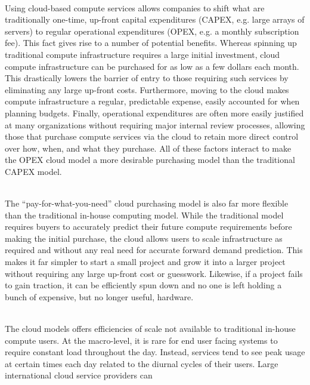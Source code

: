 \begin{packed_desc}
\item[OPEX vs CAPEX] \hfill \\ Using cloud-based compute services
  allows companies to shift what are traditionally one-time, up-front
  capital expenditures (CAPEX, e.g. large arrays of servers) to
  regular operational expenditures (OPEX, e.g. a monthly subscription
  fee). This fact gives rise to a number of potential
  benefits. Whereas spinning up traditional compute infrastructure
  requires a large initial investment, cloud compute infrastructure
  can be purchased for as low as a few dollars each month. This
  drastically lowers the barrier of entry to those requiring such
  services by eliminating any large up-front costs. Furthermore,
  moving to the cloud makes compute infrastructure a regular,
  predictable expense, easily accounted for when planning
  budgets. Finally, operational expenditures are often more easily
  justified at many organizations without requiring major internal
  review processes, allowing those that purchase compute services via
  the cloud to retain more direct control over how, when, and what
  they purchase. All of these factors interact to make the OPEX cloud
  model a more desirable purchasing model than the traditional CAPEX
  model.
\item[Flexibility] \hfill \\ The ``pay-for-what-you-need'' cloud
  purchasing model is also far more flexible than the traditional
  in-house computing model. While the traditional model requires
  buyers to accurately predict their future compute requirements
  before making the initial purchase, the cloud allows users to scale
  infrastructure as required and without any real need for accurate
  forward demand prediction. This makes it far simpler to start a
  small project and grow it into a larger project without requiring
  any large up-front cost or guesswork. Likewise, if a project fails
  to gain traction, it can be efficiently spun down and no one is left
  holding a bunch of expensive, but no longer useful, hardware.
\item[Efficiency] \hfill \\ The cloud models offers efficiencies of
  scale not available to traditional in-house compute users. At the
  macro-level, it is rare for end user facing systems to require
  constant load throughout the day. Instead, services tend to see peak
  usage at certain times each day related to the diurnal cycles of
  their users. Large international cloud service providers can

\end{packed_desc}
